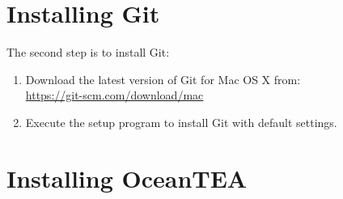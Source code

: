 \documentclass[12pt,a4paper,english,oneside,parskip=false]{scrartcl} %
\begin{document}
\section{Installing Git} \label{sec:git}

The second step is to install Git: 
\begin{enumerate}
	\item Download the latest version of Git for Mac OS X from:\\ \url{https://git-scm.com/download/mac}
	\item Execute the setup program to install Git with default settings. 
\end{enumerate}


\section{Installing OceanTEA} \label{sec:oceantea}
\end{document}
